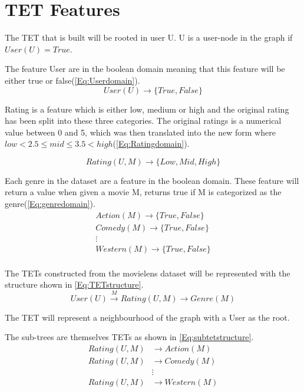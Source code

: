 \section{TET Features}
The TET that is built will be rooted in user U.
U is a user-node in the graph if $User(U) = True$. 

The feature User are in the boolean domain meaning that this feature will be either true or false(\autoref{Eq:Userdomain}).
\begin{equation}\label{Eq:Userdomain}
User(U)\rightarrow \{True, False\}
\end{equation}

Rating is a feature which is either low, medium or high and the original rating has been split into these three categories.
The original ratings is a numerical value between 0 and 5, which was then translated into the new form where $low<2.5\leq mid \leq 3.5<high$(\autoref{Eq:Ratingdomain}).

\begin{equation}\label{Eq:Ratingdomain}
Rating(U, M) \rightarrow \{Low, Mid, High\}
\end{equation}

Each genre in the dataset are a feature in the boolean domain. These feature will return a value when given a movie M, returns true if M is categorized as the genre(\autoref{Eq:genredomain}).
\begin{equation}\label{Eq:genredomain}
\begin{aligned}
Action(M) \rightarrow \{True, False\} \\
Comedy(M) \rightarrow \{True, False\} \\
\vdots \\
Western(M) \rightarrow \{True, False\} \\
\end{aligned}
\end{equation}

The TETs constructed from the movielens dataset will be represented with the structure shown in \autoref{Eq:TETstructure}.
\begin{equation}\label{Eq:TETstructure}
User(U) \stackrel{M}{\longrightarrow} Rating(U,M) \longrightarrow Genre(M)
\end{equation}

The TET will represent a neighbourhood of the graph with a User as the root.

The sub-trees are themselves TETs as shown in \autoref{Eq:subtetstructure}.
\begin{equation}\label{Eq:subtetstructure}
\begin{aligned}
Rating(U,M)& \longrightarrow Action(M) \\
Rating(U,M)& \longrightarrow Comedy(M)\\
& \vdots \\
Rating(U,M)& \longrightarrow Western(M)
\end{aligned}	
\end{equation}

